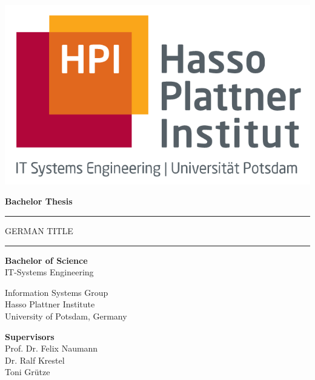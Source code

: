 \begin{titlepage}
  \begin{center}

    \includegraphics[scale=.3]{images/HPI.png}

    \vspace{1cm}

    {\Large\bfseries Bachelor Thesis \par}

    \vspace{0.5cm}

    \rule{\textwidth}{0.4pt}
    {\LARGE\bfseries \thetitle \par}
    \vspace{0.5cm}

    {\large\bfseries{GERMAN TITLE \par}}
    \rule{\textwidth}{0.4pt}


    \vspace{0.8cm}

    \Large{\theauthor}

    \vspace{0.8cm}

    {\large\bfseries{Bachelor of Science}}\\
    IT-Systems Engineering
    \vspace{0.3cm}

    Information Systems Group\\
    Hasso Plattner Institute\\
    University of Potsdam, Germany

    \vspace{0.8cm}

    \textbf{Supervisors}\\
    Prof. Dr. Felix Naumann\\
    Dr. Ralf Krestel\\
    Toni Grütze


    \vspace{0.8cm}

    \usvardate{}
  \end{center}
\end{titlepage}
